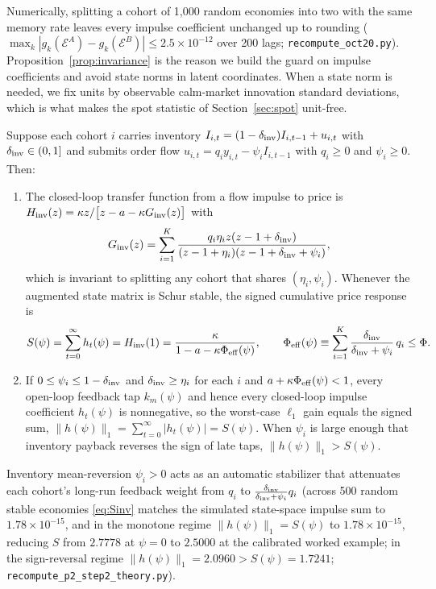 Numerically, splitting a cohort of 1{,}000 random economies into two with the same memory rate leaves every impulse coefficient unchanged up to rounding ($\max_k|g_k(\mathcal E^A)-g_k(\mathcal E^B)|\le2.5\times10^{-12}$ over 200 lags; \texttt{recompute\_oct20.py}). Proposition~\ref{prop:invariance} is the reason we build the guard on impulse coefficients and avoid state norms in latent coordinates. When a state norm is needed, we fix units by observable calm-market innovation standard deviations, which is what makes the spot statistic of Section~\ref{sec:spot} unit-free.

\begin{proposition}\label{prop:inventory_S}
Suppose each cohort $i$ carries inventory $I_{i,t}=(1-\delta_{\rm inv})I_{i,t-1}+u_{i,t}$ with $\delta_{\rm inv}\in(0,1]$ and submits order flow $u_{i,t}=q_i y_{i,t}-\psi_i I_{i,t-1}$ with $q_i\ge0$ and $\psi_i\ge0$. Then:
\begin{enumerate}[label=(\roman*)]
\item The closed-loop transfer function from a flow impulse to price is $H_{\rm inv}(z)=\kappa z/\bigl[z-a-\kappa G_{\rm inv}(z)\bigr]$ with
\[
G_{\rm inv}(z)=\sum_{i=1}^K \frac{q_i\eta_i z(z-1+\delta_{\rm inv})}{(z-1+\eta_i)(z-1+\delta_{\rm inv}+\psi_i)},
\]
which is invariant to splitting any cohort that shares $(\eta_i,\psi_i)$. Whenever the augmented state matrix is Schur stable, the signed cumulative price response is
\begin{equation}\label{eq:Sinv}
S(\psi)=\sum_{t=0}^\infty h_t(\psi)=H_{\rm inv}(1)=\frac{\kappa}{1-a-\kappa\Phi_{\rm eff}(\psi)},\qquad \Phi_{\rm eff}(\psi)\equiv\sum_{i=1}^K\frac{\delta_{\rm inv}}{\delta_{\rm inv}+\psi_i}\,q_i\le\Phi.
\end{equation}
\item If $0\le\psi_i\le 1-\delta_{\rm inv}$ and $\delta_{\rm inv}\ge\eta_i$ for each $i$ and $a+\kappa\Phi_{\rm eff}(\psi)<1$, every open-loop feedback tap $k_m(\psi)$ and hence every closed-loop impulse coefficient $h_t(\psi)$ is nonnegative, so the worst-case $\ell_1$ gain equals the signed sum, $\|h(\psi)\|_1=\sum_{t=0}^\infty |h_t(\psi)|=S(\psi)$. When $\psi_i$ is large enough that inventory payback reverses the sign of late taps, $\|h(\psi)\|_1>S(\psi)$.
\end{enumerate}
\end{proposition}

Inventory mean-reversion $\psi_i>0$ acts as an automatic stabilizer that attenuates each cohort's long-run feedback weight from $q_i$ to $\frac{\delta_{\rm inv}}{\delta_{\rm inv}+\psi_i}q_i$ (across 500 random stable economies \eqref{eq:Sinv} matches the simulated state-space impulse sum to $1.78\times10^{-15}$, and in the monotone regime $\|h(\psi)\|_1=S(\psi)$ to $1.78\times10^{-15}$, reducing $S$ from $2.7778$ at $\psi=0$ to $2.5000$ at the calibrated worked example; in the sign-reversal regime $\|h(\psi)\|_1=2.0960>S(\psi)=1.7241$; \texttt{recompute\_p2\_step2\_theory.py}).

